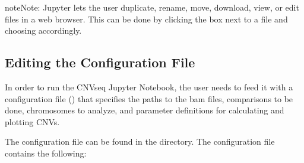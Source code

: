 \documentclass[letterpaper,10pt,english]{sphinxhowto}
\begin{document}
\begin{sphinxadmonition}{note}{Note:}
\sphinxAtStartPar
Jupyter lets the user duplicate, rename, move, download, view, or edit files in a web browser. This can be done by clicking the box next to a file and choosing accordingly.
\end{sphinxadmonition}


\subsection{Editing the Configuration File}
\label{\detokenize{index:editing-the-configuration-file}}
\sphinxAtStartPar
In order to run the CNVseq Jupyter Notebook, the user needs to feed it with a configuration file () that specifies the paths to the bam files, comparisons to be done, chromosomes to analyze, and parameter definitions for calculating and plotting CNVs.

\sphinxAtStartPar
The configuration file  can be found in the  directory. The configuration file contains the following:
\end{document}
